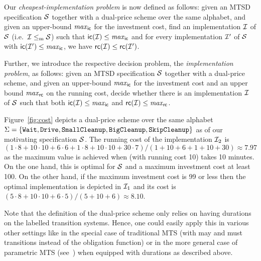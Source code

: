 %

Our \emph{cheapest-implementation problem} 
is now defined as follows: given an MTSD specification $\mathcal S$ %
together with a dual-price scheme over the same alphabet, and given an upper-bound $\mathit{max}_{\mathsf{ic}}$ 
for the
investment cost, find an implementation $\mathcal I$ of $\mathcal S$ (i.e.~$\mathcal I\le_\mathrm m\mathcal S$) such that
$\mathsf{ic}(\mathcal I) \leq \mathit{max}_{\mathsf{ic}}$ 
and for every implementation $\mathcal I'$ of $\mathcal S$ with
$\mathsf{ic}(\mathcal I') \leq \mathit{max}_{\mathsf{ic}}$, we have $\mathsf{rc}(\mathcal I) \leq \mathsf{rc}(\mathcal I')$.


Further, we introduce the respective decision problem, 
the \emph{implementation problem}, as follows: given an MTSD specification $\mathcal S$ %
together with a dual-price scheme, and given an upper-bound $\mathit{max}_{\mathsf{ic}}$ 
for the investment cost and an upper bound $\mathit{max}_{\mathsf{rc}}$ on the running cost, decide whether there is an implementation $\mathcal I$ of $\mathcal S$ such that both
$\mathsf{ic}(\mathcal I) \leq \mathit{max}_{\mathsf{ic}}$ 
and $\mathsf{rc}(\mathcal I) \leq \mathit{max}_{\mathsf{rc}}$.

\begin{example}\label{ex:prices}
Figure~\ref{fig:cost} depicts a dual-price scheme over the same alphabet \linebreak
$\Sigma=\{\texttt{Wait},\texttt{Drive},\texttt{SmallCleanup}, \texttt{BigCleanup}, \texttt{SkipCleanup}\}$ as of our
motivating specification $\mathcal S$. The running cost of the implementation $\mathcal I_2$ is
$(1\cdot8+10\cdot 10+6\cdot6+1\cdot8+10\cdot 10+30\cdot
7)/(1+10+6+1+10+30)\approx7.97$ as the maximum value is achieved when \DriveBus
(with running cost 10) takes 10 minutes. On the one hand, this is optimal for
$\mathcal S$ and a maximum investment cost at least 100. On the other hand, if the maximum
investment cost is 99 or less then the optimal implementation is depicted in
$\mathcal I_1$ and its cost is $(5\cdot8+10\cdot10+6\cdot5)/(5+10+6)\approx8.10$.
\end{example}

\begin{remark}
Note that the definition of the dual-price scheme only relies on having durations on the labelled transition systems. Hence, one could easily apply this in various other settings like in the special case of traditional MTS (with may and must transitions instead of the obligation function) or in the more general case of parametric MTS (see~\cite{BKLMS:ATVA:11}) when equipped with durations as described above.
\end{remark}



